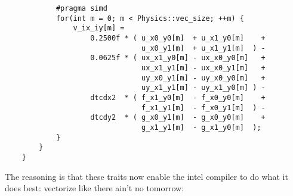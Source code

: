 {\begin{lstlisting}
            #pragma simd
            for(int m = 0; m < Physics::vec_size; ++m) {
                v_ix_iy[m] =
                    0.2500f * ( u_x0_y0[m]  + u_x1_y0[m]    +
                                u_x0_y1[m]  + u_x1_y1[m]  ) -
                    0.0625f * ( ux_x1_y0[m] - ux_x0_y0[m]   +
                                ux_x1_y1[m] - ux_x0_y1[m]   +
                                uy_x0_y1[m] - uy_x0_y0[m]   +
                                uy_x1_y1[m] - uy_x1_y0[m] ) -
                    dtcdx2  * ( f_x1_y0[m]  - f_x0_y0[m]    +
                                f_x1_y1[m]  - f_x0_y1[m]  ) -
                    dtcdy2  * ( g_x0_y1[m]  - g_x0_y0[m]    +
                                g_x1_y1[m]  - g_x1_y0[m]  );                    
            }
        }
    }
\end{lstlisting}
}

The reasoning is that these traits now enable the intel compiler to do what it does best: vectorize like there ain't no tomorrow:

